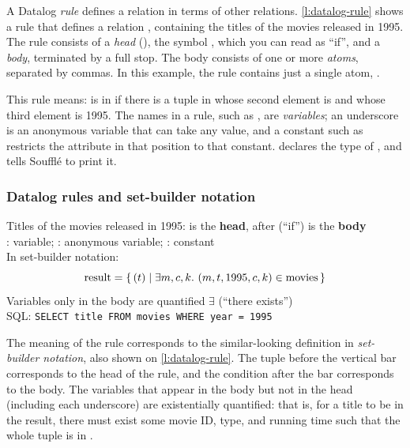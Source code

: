 A Datalog \emph{rule} defines a relation in terms of other relations.
\autoref{l:datalog-rule} shows a rule that defines a relation , containing the titles of the movies released in 1995.
The rule consists of a \emph{head} (), the symbol \code{:-}, which you can read as ``if'', and a \emph{body}, terminated by a full stop.
The body consists of one or more \emph{atoms}, separated by commas.
In this example, the rule contains just a single atom, .

This rule means:  is in  if there is a tuple in  whose second element is  and whose third element is 1995.
The names in a rule, such as , are \emph{variables}; an underscore is an anonymous variable that can take any value, and a constant such as  restricts the attribute in that position to that constant.
 declares the type of , and  tells Soufflé to print it.

\begin{frame}
    \label{s:datalog-rule}
    \frametitle{Datalog rules and set-builder notation}
    Titles of the movies released in 1995:
    \vspace{0.3em}
     is the \textbf{head}, after \code{:-} (``if'') is the \textbf{body}\\[0.3em]
    : variable; \code{_}: anonymous variable; : constant\\[1em]\pause
    In set-builder notation:
    \[ \mathrm{result} = \{\, (t) \mid \exists m, c, k.\ (m, t, 1995, c, k) \in \mathrm{movies} \,\} \]
    Variables only in the body are quantified $\exists$ (``there exists'')\\[1em]
    SQL: \texttt{SELECT title FROM movies WHERE year = 1995}
\end{frame}
\label{l:datalog-rule}

The meaning of the rule corresponds to the similar-looking definition in \emph{set-builder notation}, also shown on \autoref{l:datalog-rule}.
The tuple before the vertical bar corresponds to the head of the rule, and the condition after the bar corresponds to the body.
The variables that appear in the body but not in the head (including each underscore) are existentially quantified: that is, for a title to be in the result, there must exist some movie ID, type, and running time such that the whole tuple is in .

